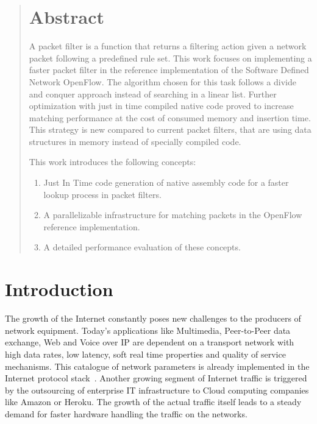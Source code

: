 \documentclass[a4paper,
		12pt,
		parskip=full,
		titlepage
		]{scrartcl}
\begin{document}
\begin{abstract}
\section*{Abstract}
A packet filter is a function that returns a filtering action given a network 
packet following a predefined rule set.
This work focuses on implementing a faster packet filter in the reference 
implementation of the Software Defined Network OpenFlow.
The algorithm chosen for this task follows a divide and conquer approach
instead of searching in a linear list.
Further optimization with just in time compiled native code proved to increase 
matching performance at the cost of consumed memory and insertion time. %
This strategy is new compared to current packet filters, that are using 
data structures in memory instead of specially compiled code.

This work introduces the following concepts:
\begin{enumerate}
    \item Just In Time code generation of native assembly code for a 
        faster lookup process in packet filters.
    \item A parallelizable infrastructure for matching packets in the OpenFlow
        reference implementation.
    \item A detailed performance evaluation of these concepts.
\end{enumerate}

\end{abstract}

\setcounter{page}{1}
\tableofcontents{}

\pagebreak

\pagestyle{scrheadings}

\section{Introduction}
The growth of the Internet constantly poses new challenges to the producers of network equipment.
Today's applications like Multimedia, Peer-to-Peer data exchange, Web and Voice over IP are dependent on a transport network with
high data rates, low latency, soft real time properties and quality of service mechanisms.
This catalogue of network parameters is already implemented in the Internet protocol stack~\cite{rfc3260, rfc3261, rfc5694, rfc3550}.
Another growing segment of Internet traffic is triggered by the outsourcing of 
enterprise IT infrastructure to Cloud computing companies like Amazon or Heroku.
The growth of the actual traffic itself leads to a steady demand for faster hardware handling the traffic on the networks.
\end{document}
